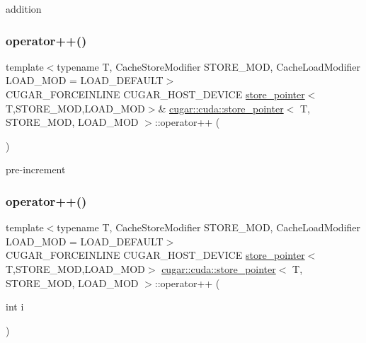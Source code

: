 addition \mbox{\label{structcugar_1_1cuda_1_1store__pointer_ae42f6b879227fc099989d6c709230de5}} 
\subsubsection{\texorpdfstring{operator++()}{operator++()}\hspace{0.1cm}{\footnotesize\ttfamily [1/2]}}
{\footnotesize\ttfamily template$<$typename T, Cache\+Store\+Modifier S\+T\+O\+R\+E\+\_\+\+M\+OD, Cache\+Load\+Modifier L\+O\+A\+D\+\_\+\+M\+OD = L\+O\+A\+D\+\_\+\+D\+E\+F\+A\+U\+LT$>$ \\
C\+U\+G\+A\+R\+\_\+\+F\+O\+R\+C\+E\+I\+N\+L\+I\+NE C\+U\+G\+A\+R\+\_\+\+H\+O\+S\+T\+\_\+\+D\+E\+V\+I\+CE \hyperlink{structcugar_1_1cuda_1_1store__pointer}{store\+\_\+pointer}$<$T,S\+T\+O\+R\+E\+\_\+\+M\+OD,L\+O\+A\+D\+\_\+\+M\+OD$>$\& \hyperlink{structcugar_1_1cuda_1_1store__pointer}{cugar\+::cuda\+::store\+\_\+pointer}$<$ T, S\+T\+O\+R\+E\+\_\+\+M\+OD, L\+O\+A\+D\+\_\+\+M\+OD $>$\+::operator++ (\begin{DoxyParamCaption}{ }\end{DoxyParamCaption})\hspace{0.3cm}{\ttfamily [inline]}}

pre-\/increment \mbox{\label{structcugar_1_1cuda_1_1store__pointer_a09257ce514e6fa8625fdfe620c1911bf}} 
\subsubsection{\texorpdfstring{operator++()}{operator++()}\hspace{0.1cm}{\footnotesize\ttfamily [2/2]}}
{\footnotesize\ttfamily template$<$typename T, Cache\+Store\+Modifier S\+T\+O\+R\+E\+\_\+\+M\+OD, Cache\+Load\+Modifier L\+O\+A\+D\+\_\+\+M\+OD = L\+O\+A\+D\+\_\+\+D\+E\+F\+A\+U\+LT$>$ \\
C\+U\+G\+A\+R\+\_\+\+F\+O\+R\+C\+E\+I\+N\+L\+I\+NE C\+U\+G\+A\+R\+\_\+\+H\+O\+S\+T\+\_\+\+D\+E\+V\+I\+CE \hyperlink{structcugar_1_1cuda_1_1store__pointer}{store\+\_\+pointer}$<$T,S\+T\+O\+R\+E\+\_\+\+M\+OD,L\+O\+A\+D\+\_\+\+M\+OD$>$ \hyperlink{structcugar_1_1cuda_1_1store__pointer}{cugar\+::cuda\+::store\+\_\+pointer}$<$ T, S\+T\+O\+R\+E\+\_\+\+M\+OD, L\+O\+A\+D\+\_\+\+M\+OD $>$\+::operator++ (\begin{DoxyParamCaption}\item[{int}]{i }\end{DoxyParamCaption})\hspace{0.3cm}{\ttfamily [inline]}}

